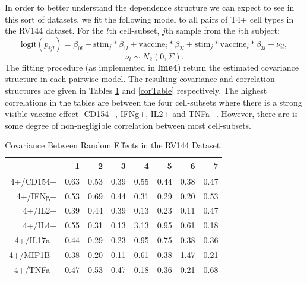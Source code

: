 \documentclass{article}\usepackage[]{graphicx}\usepackage[]{color}
\begin{document}
In order to better understand the dependence structure we can expect to see in this sort of datasets, we fit the following model to all pairs of T4+ cell types in the RV144 dataset. For the $l$th cell-subset, $j$th sample from the $i$th subject: 
$$
\text{logit}(p_{ijl}) = \beta_{0l} + 
\text{stim}_{j} * \beta_{1l} + \text{vaccine}_{i}*\beta_{2l} 
+ \text{stim}_j * \text{vaccine}_i * \beta_{3l} + \nu_{il},
$$$$
\nu_{i} \sim N_2(0, \Sigma).
$$
The fitting procedure (as implemented in \textbf{lme4}) return the estimated covariance structure in each pairwise model. The resulting covariance and correlation structures are given in Tables \ref{covTable} and \ref{corTable} respectively. The highest correlations in the tables are between the four cell-subsets where there is a strong visible vaccine effect- CD154+, IFNg+, IL2+ and TNFa+. However, there are is some degree of non-negligible correlation between most cell-subsets. 

\begin{table}[ht]
\centering
\begin{tabular}{rrrrrrrr}
  \hline
 & 1 & 2 & 3 & 4 & 5 & 6 & 7 \\ 
  \hline
4+/CD154+ & 0.63 & 0.53 & 0.39 & 0.55 & 0.44 & 0.38 & 0.47 \\ 
  4+/IFNg+ & 0.53 & 0.69 & 0.44 & 0.31 & 0.29 & 0.20 & 0.53 \\ 
  4+/IL2+ & 0.39 & 0.44 & 0.39 & 0.13 & 0.23 & 0.11 & 0.47 \\ 
  4+/IL4+ & 0.55 & 0.31 & 0.13 & 3.13 & 0.95 & 0.61 & 0.18 \\ 
  4+/IL17a+ & 0.44 & 0.29 & 0.23 & 0.95 & 0.75 & 0.38 & 0.36 \\ 
  4+/MIP1B+ & 0.38 & 0.20 & 0.11 & 0.61 & 0.38 & 1.47 & 0.21 \\ 
  4+/TNFa+ & 0.47 & 0.53 & 0.47 & 0.18 & 0.36 & 0.21 & 0.68 \\ 
   \hline
\end{tabular}
\caption{Covariance Between Random Effects in the RV144 Dataset.}
\label{covTable}
\end{table}
\end{document}
